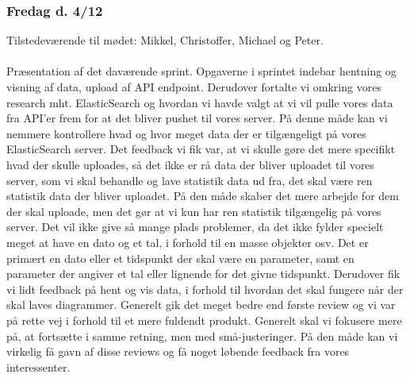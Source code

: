 \subsubsection{Fredag d. 4/12}
Tilstedeværende til mødet: Mikkel, Christoffer, Michael og Peter.
\\\\
Præsentation af det daværende sprint. Opgaverne i sprintet indebar hentning og visning af data, upload af API endpoint. Derudover fortalte vi omkring vores research mht. ElasticSearch og hvordan vi havde valgt at vi vil pulle vores data fra API'er frem for at det bliver pushet til vores server. På denne måde kan vi nemmere kontrollere hvad og hvor meget data der er tilgængeligt på vores ElasticSearch server.
Det feedback vi fik var, at vi skulle gøre det mere specifikt hvad der skulle uploades, så det ikke er rå data der bliver uploadet til vores server, som vi skal behandle og lave statistik data ud fra, det skal være ren statistik data der bliver uploadet. På den måde skaber det mere arbejde for dem der skal uploade, men det gør at vi kun har ren statistik tilgængelig på vores server. Det vil ikke give så mange plads problemer, da det ikke fylder specielt meget at have en dato og et tal, i forhold til en masse objekter osv. Det er primært en dato eller et tidspunkt der skal være en parameter, samt en parameter der angiver et tal eller lignende for det givne tidspunkt.
Derudover fik vi lidt feedback på hent og vis data, i forhold til hvordan det skal fungere når der skal laves diagrammer.
Generelt gik det meget bedre end første review og vi var på rette vej i forhold til et mere fuldendt produkt. Generelt skal vi fokusere mere på, at fortsætte i samme retning, men med små-justeringer. På den måde kan vi virkelig få gavn af disse reviews og få noget løbende feedback fra vores interessenter.
